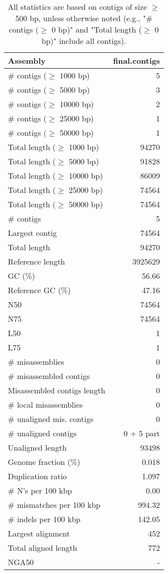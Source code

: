 \documentclass[12pt,a4paper]{article}
\begin{document}
\begin{table}[ht]
\begin{center}
\caption{All statistics are based on contigs of size $\geq$ 500 bp, unless otherwise noted (e.g., "\# contigs ($\geq$ 0 bp)" and "Total length ($\geq$ 0 bp)" include all contigs).}
\begin{tabular}{|l*{1}{|r}|}
\hline
Assembly & final.contigs \\ \hline
\# contigs ($\geq$ 1000 bp) & 5 \\ \hline
\# contigs ($\geq$ 5000 bp) & 3 \\ \hline
\# contigs ($\geq$ 10000 bp) & 2 \\ \hline
\# contigs ($\geq$ 25000 bp) & 1 \\ \hline
\# contigs ($\geq$ 50000 bp) & 1 \\ \hline
Total length ($\geq$ 1000 bp) & 94270 \\ \hline
Total length ($\geq$ 5000 bp) & 91828 \\ \hline
Total length ($\geq$ 10000 bp) & 86009 \\ \hline
Total length ($\geq$ 25000 bp) & 74564 \\ \hline
Total length ($\geq$ 50000 bp) & 74564 \\ \hline
\# contigs & 5 \\ \hline
Largest contig & 74564 \\ \hline
Total length & 94270 \\ \hline
Reference length & 3925629 \\ \hline
GC (\%) & 56.66 \\ \hline
Reference GC (\%) & 47.16 \\ \hline
N50 & 74564 \\ \hline
N75 & 74564 \\ \hline
L50 & 1 \\ \hline
L75 & 1 \\ \hline
\# misassemblies & 0 \\ \hline
\# misassembled contigs & 0 \\ \hline
Misassembled contigs length & 0 \\ \hline
\# local misassemblies & 0 \\ \hline
\# unaligned mis. contigs & 0 \\ \hline
\# unaligned contigs & 0 + 5 part \\ \hline
Unaligned length & 93498 \\ \hline
Genome fraction (\%) & 0.018 \\ \hline
Duplication ratio & 1.097 \\ \hline
\# N's per 100 kbp & 0.00 \\ \hline
\# mismatches per 100 kbp & 994.32 \\ \hline
\# indels per 100 kbp & 142.05 \\ \hline
Largest alignment & 452 \\ \hline
Total aligned length & 772 \\ \hline
NGA50 & - \\ \hline
\end{tabular}
\end{center}
\end{table}
\end{document}
